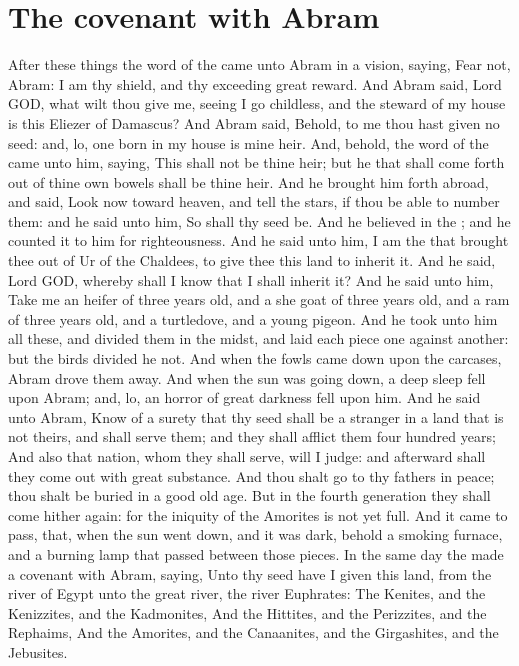\section*{The \LORDs covenant with Abram}
\begin{biblechapter} %
\verse After these things the word of the \LORD came unto Abram in a vision, saying, Fear not, Abram: I am thy shield, and thy exceeding great reward.
\verse And Abram said, Lord GOD, what wilt thou give me, seeing I go childless, and the steward of my house is this Eliezer of Damascus?
\verse And Abram said, Behold, to me thou hast given no seed: and, lo, one born in my house is mine heir.
\verse And, behold, the word of the \LORD came unto him, saying, This shall not be thine heir; but he that shall come forth out of thine own bowels shall be thine heir.
\verse And he brought him forth abroad, and said, Look now toward heaven, and tell the stars, if thou be able to number them: and he said unto him, So shall thy seed be.
\verse And he believed in the \LORD; and he counted it to him for righteousness.
\verse And he said unto him, I am the \LORD that brought thee out of Ur of the Chaldees, to give thee this land to inherit it.
\verse And he said, Lord GOD, whereby shall I know that I shall inherit it?
\verse And he said unto him, Take me an heifer of three years old, and a she goat of three years old, and a ram of three years old, and a turtledove, and a young pigeon.
\verse And he took unto him all these, and divided them in the midst, and laid each piece one against another: but the birds divided he not.
\verse And when the fowls came down upon the carcases, Abram drove them away.
\verse And when the sun was going down, a deep sleep fell upon Abram; and, lo, an horror of great darkness fell upon him.
\verse And he said unto Abram, Know of a surety that thy seed shall be a stranger in a land that is not theirs, and shall serve them; and they shall afflict them four hundred years;
\verse And also that nation, whom they shall serve, will I judge: and afterward shall they come out with great substance.
\verse And thou shalt go to thy fathers in peace; thou shalt be buried in a good old age.
\verse But in the fourth generation they shall come hither again: for the iniquity of the Amorites is not yet full.
\verse And it came to pass, that, when the sun went down, and it was dark, behold a smoking furnace, and a burning lamp that passed between those pieces.
\verse In the same day the \LORD made a covenant with Abram, saying, Unto thy seed have I given this land, from the river of Egypt unto the great river, the river Euphrates:
\verse The Kenites, and the Kenizzites, and the Kadmonites,
\verse And the Hittites, and the Perizzites, and the Rephaims,
\verse And the Amorites, and the Canaanites, and the Girgashites, and the Jebusites.
\end{biblechapter}


